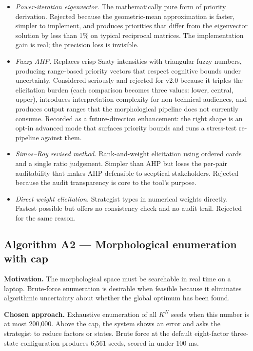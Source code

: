 \documentclass[11pt,a4paper]{article}
\begin{document}
\begin{itemize}[leftmargin=*]
  \item \emph{Power-iteration eigenvector.} The mathematically pure form of priority derivation. Rejected because the geometric-mean approximation is faster, simpler to implement, and produces priorities that differ from the eigenvector solution by less than 1\% on typical reciprocal matrices. The implementation gain is real; the precision loss is invisible.
  \item \emph{Fuzzy AHP.} Replaces crisp Saaty intensities with triangular fuzzy numbers, producing range-based priority vectors that respect cognitive bounds under uncertainty. Considered seriously and rejected for v2.0 because it triples the elicitation burden (each comparison becomes three values: lower, central, upper), introduces interpretation complexity for non-technical audiences, and produces output ranges that the morphological pipeline does not currently consume. Recorded as a future-direction enhancement: the right shape is an opt-in advanced mode that surfaces priority bounds and runs a stress-test re-pipeline against them.
  \item \emph{Simos--Roy revised method.} Rank-and-weight elicitation using ordered cards and a single ratio judgement. Simpler than AHP but loses the per-pair auditability that makes AHP defensible to sceptical stakeholders. Rejected because the audit transparency is core to the tool's purpose.
  \item \emph{Direct weight elicitation.} Strategist types in numerical weights directly. Fastest possible but offers no consistency check and no audit trail. Rejected for the same reason.
\end{itemize}

\subsection{Algorithm A2 — Morphological enumeration with cap}

\textbf{Motivation.} The morphological space must be searchable in real time on a laptop. Brute-force enumeration is desirable when feasible because it eliminates algorithmic uncertainty about whether the global optimum has been found.

\textbf{Chosen approach.} Exhaustive enumeration of all $K^N$ seeds when this number is at most 200{,}000. Above the cap, the system shows an error and asks the strategist to reduce factors or states. Brute force at the default eight-factor three-state configuration produces 6{,}561 seeds, scored in under 100 ms.
\end{document}
